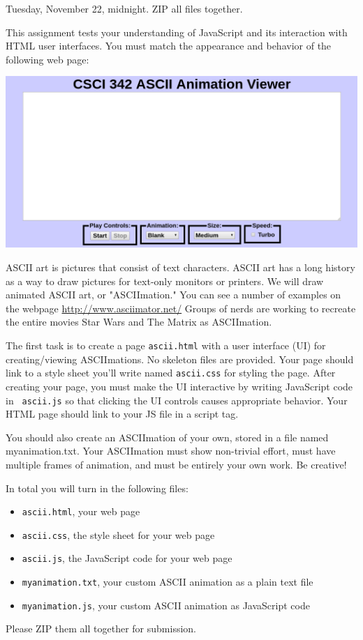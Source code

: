 \documentclass{article}
\newcommand{\myitem}[1]{\noindent\hspace{-.25in}{\large\bf #1}}
\begin{document}
\myitem{CSCI 342, Fall 2016, Homework \# 4}

\myitem{Due date:}  Tuesday, November 22, midnight.  ZIP all files
together.

\myitem{Instructions:}


This assignment tests your understanding of JavaScript and its
interaction with HTML user interfaces.  You must match the appearance
and behavior of the following web page:

\centerline{\includegraphics[scale=0.5]{images/screenshot.png}}

ASCII art is pictures that consist of text characters.  ASCII art has
a long history as a way to draw pictures for text-only monitors or
printers.  We will draw animated ASCII art, or "ASCIImation." You can
see a number of examples on the webpage
\url{http://www.asciimator.net/} Groups of nerds are working to
recreate the entire movies Star Wars and The Matrix as ASCIImation.

The first task is to create a page {\tt ascii.html} with a user
interface (UI) for creating/viewing ASCIImations.  No skeleton files
are provided.  Your page should link to a style sheet you'll write
named {\tt ascii.css} for styling the page.  After creating your page,
you must make the UI interactive by writing JavaScript code in {\tt
  ascii.js} so that clicking the UI controls causes appropriate
behavior.  Your HTML page should link to your JS file in a script tag.

You should also create an ASCIImation of your own, stored in a file
named myanimation.txt.  Your ASCIImation must show non-trivial effort,
must have multiple frames of animation, and must be entirely your own
work.  Be creative!

In total you will turn in the following
files:
\begin{itemize}
\item {\tt ascii.html}, your web page
\item {\tt ascii.css}, the style sheet for your
  web page
\item {\tt ascii.js}, the JavaScript code for your web page
\item {\tt myanimation.txt}, your custom ASCII animation as a plain text file
\item {\tt myanimation.js}, your custom ASCII animation as JavaScript code
\end{itemize}
Please ZIP them all together for submission.
\end{document}
